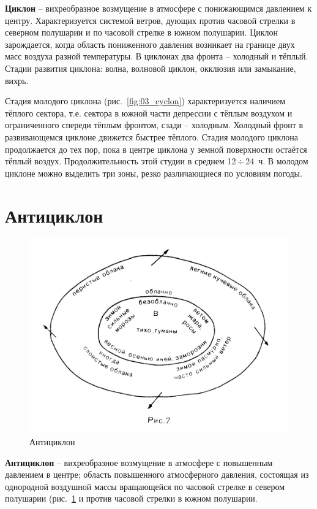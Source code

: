 \documentclass[a4paper, 12pt, twoside, final, book, russian, fittopage, cyremdash, openright]{ncc}
\newcommand{\otdo}{\,\ensuremath{\div}\,}
\begin{document}
\textbf{Циклон} \--- вихреобразное возмущение в
атмосфере с понижающимся давлением к центру. Характеризуется системой
ветров, дующих против часовой стрелки в северном полушарии и по
часовой стрелке в южном полушарии. Циклон зарождается, когда область
пониженного давления возникает на границе двух масс воздуха разной
температуры. В циклонах два фронта \--- холодный и тёплый. Стадии
развития циклона: волна, волновой циклон, окклюзия или замыкание,
вихрь.

Стадия молодого циклона (рис.~\ref{fig:03_cyclon}) характеризуется
наличием тёплого сектора, т.е. сектора в южной части депрессии с
тёплым воздухом и ограниченного спереди тёплым фронтом, сзади \---
холодным. Холодный фронт в развивающемся циклоне движется быстрее
тёплого. Стадия молодого циклона продолжается до тех пор, пока в
центре циклона у земной поверхности остаётся тёплый
воздух. Продолжительность этой студии в среднем 12\otdo{}24~ч. В молодом
циклоне можно выделить три зоны, резко различающиеся по условиям
погоды.

\section{Антициклон}
\label{sec:anticyclon}

\begin{figure}[htb]
   \centering
   \includegraphics[scale=1.0]{04_anticyclon.pdf}
   \caption{Антициклон}
   \label{fig:04_anticyclon}
\end{figure}

\textbf{Антициклон} \--- вихреобразное возмущение в
атмосфере с повышенным давлением в центре; область повышенного
атмосферного давления, состоящая из однородной воздушной массы
вращающейся по часовой стрелке в севером полушарии
(рис.~\ref{fig:04_anticyclon} и против часовой стрелки в южном
полушарии.
\end{document}
